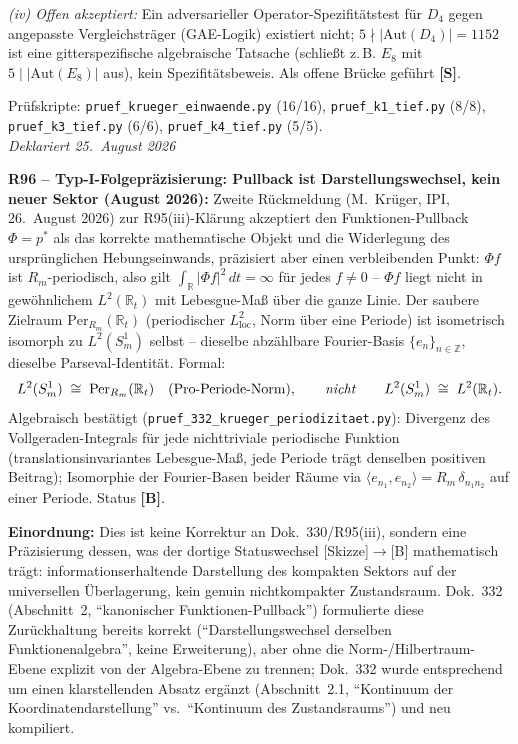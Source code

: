 \emph{(iv) Offen akzeptiert:} Ein adversarieller Operator-Spezifitätstest
für $D_4$ gegen angepasste Vergleichsträger (GAE-Logik) existiert nicht;
$5 \nmid |\mathrm{Aut}(D_4)| = 1152$ ist eine gitterspezifische
algebraische Tatsache (schließt z.\,B. $E_8$ mit $5 \mid |\mathrm{Aut}(E_8)|$
aus), kein Spezifitätsbeweis. Als offene Brücke geführt \textbf{[S]}.

Prüfskripte: \texttt{pruef\_krueger\_einwaende.py} (16/16),
\texttt{pruef\_k1\_tief.py} (8/8), \texttt{pruef\_k3\_tief.py} (6/6),
\texttt{pruef\_k4\_tief.py} (5/5).\\
\emph{Deklariert 25.~August 2026}

\medskip

\textbf{R96 -- Typ-I-Folgepräzisierung: Pullback ist Darstellungswechsel, kein neuer Sektor (August 2026):}
Zweite Rückmeldung (M.~Krüger, IPI, 26.~August 2026) zur R95(iii)-Klärung
akzeptiert den Funktionen-Pullback $\Phi=p^*$ als das korrekte mathematische
Objekt und die Widerlegung des ursprünglichen Hebungseinwands, präzisiert
aber einen verbleibenden Punkt: $\Phi f$ ist $R_m$-periodisch, also gilt
$\int_{\mathbb{R}} |\Phi f|^2\,dt = \infty$ für jedes $f\neq0$ -- $\Phi f$
liegt nicht in gewöhnlichem $L^2(\mathbb{R}_t)$ mit Lebesgue-Maß über die
ganze Linie. Der saubere Zielraum $\mathrm{Per}_{R_m}(\mathbb{R}_t)$
(periodischer $L^2_\mathrm{loc}$, Norm über eine Periode) ist isometrisch
isomorph zu $L^2(S^1_m)$ selbst -- dieselbe abzählbare Fourier-Basis
$\{e_n\}_{n\in\mathbb{Z}}$, dieselbe Parseval-Identität. Formal:
\[
L^2(S^1_m) \;\cong\; \mathrm{Per}_{R_m}(\mathbb{R}_t)
\quad\text{(Pro-Periode-Norm)},
\qquad\text{\emph{nicht}}\qquad
L^2(S^1_m) \;\cong\; L^2(\mathbb{R}_t).
\]
Algebraisch bestätigt (\texttt{pruef\_332\_krueger\_periodizitaet.py}):
Divergenz des Vollgeraden-Integrals für jede nichttriviale periodische
Funktion (translationsinvariantes Lebesgue-Maß, jede Periode trägt
denselben positiven Beitrag); Isomorphie der Fourier-Basen beider Räume
via $\langle e_{n_1},e_{n_2}\rangle=R_m\,\delta_{n_1 n_2}$ auf einer Periode.
Status \textbf{[B]}.

\textbf{Einordnung:} Dies ist keine Korrektur an Dok.~330/R95(iii), sondern
eine Präzisierung dessen, was der dortige Statuswechsel [Skizze]$\to$[B]
mathematisch trägt: informationserhaltende Darstellung des kompakten
Sektors auf der universellen Überlagerung, kein genuin nichtkompakter
Zustandsraum. Dok.~332 (Abschnitt~2, \enquote{kanonischer Funktionen-Pullback})
formulierte diese Zurückhaltung bereits korrekt (\enquote{Darstellungswechsel
derselben Funktionenalgebra}, keine Erweiterung), aber ohne die
Norm-/Hilbertraum-Ebene explizit von der Algebra-Ebene zu trennen; Dok.~332
wurde entsprechend um einen klarstellenden Absatz ergänzt (Abschnitt~2.1,
\enquote{Kontinuum der Koordinatendarstellung} vs.\ \enquote{Kontinuum des
Zustandsraums}) und neu kompiliert.

